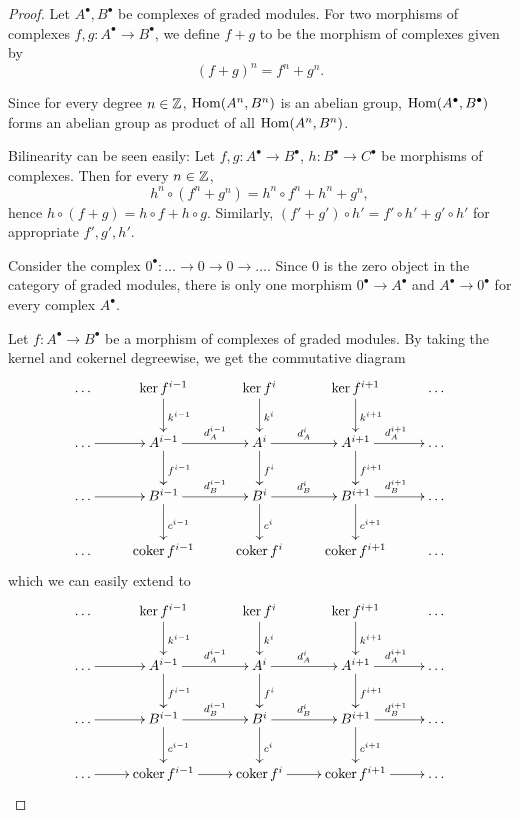 \begin{proof}
    Let $A^\bullet, B^\bullet$ be complexes of graded modules.
    For two morphisms of complexes $f,g: A^\bullet \rightarrow B^\bullet$, we define $f+g$ to be the morphism of complexes given by
    \[
        (f+g)^n = f^n + g^n.
    \]

    Since for every degree $n\in{\mathbb Z}$, $\operatorname{Hom}(A^n, B^n)$ is an abelian group, $\operatorname{Hom}(A^\bullet,B^\bullet)$ forms an abelian group as product of all $\operatorname{Hom}(A^n,B^n)$.

    Bilinearity can be seen easily:
    Let $f,g: A^\bullet \rightarrow B^\bullet$, $h: B^\bullet \rightarrow C^\bullet$ be morphisms of complexes.
    Then for every $n\in{\mathbb Z}$,
    \[
        h^n \circ (f^n + g^n) = h^n \circ f^n + h^n + g^n,
    \]
    hence $h \circ (f + g) = h \circ f + h \circ g$.
    Similarly, $(f'+g') \circ h' = f' \circ h' + g' \circ h'$ for appropriate $f', g', h'$.

    Consider the complex $0^\bullet: \dots \rightarrow 0 \rightarrow 0 \rightarrow \dots$.
    Since $0$ is the zero object in the category of graded modules, there is only one morphism $0^\bullet \rightarrow A^\bullet$ and $A^\bullet \rightarrow 0^\bullet$ for every complex $A^\bullet$.

    Let $f: A^\bullet \rightarrow B^\bullet$ be a morphism of complexes of graded modules.
    By taking the kernel and cokernel degreewise, we get the commutative diagram
    \[
        \xymatrix{
            \dots & \ker f^{i-1} \ar[d]^{k^{i-1}} & \ker f^i \ar[d]^{k^i} & \ker f^{i+1} \ar[d]^{k^{i+1}} & \dots \\
            \dots \ar[r] & A^{i-1} \ar[r]^-{d^{i-1}_A} \ar[d]^{f^{i-1}} & A^i \ar[r]^-{d^i_A} \ar[d]^{f^i} & A^{i+1} \ar[r]^{d^{i+1}_A} \ar[d]^{f^{i+1}} & \dots \\
            \dots \ar[r] & B^{i-1} \ar[r]^-{d^{i-1}_B} \ar[d]^{c^{i-1}} & B^i \ar[r]^-{d^i_B} \ar[d]^{c^i} & B^{i+1} \ar[r]^{d^{i+1}_B} \ar[d]^{c^{i+1}} & \dots \\
            \dots & \coker f^{i-1} & \coker f^i & \coker f^{i+1} & \dots
        }
    \]
    which we can easily extend to
    \[
        \xymatrix{
            \dots & \ker f^{i-1} \ar[d]^{k^{i-1}} & \ker f^i \ar[d]^{k^i} & \ker f^{i+1} \ar[d]^{k^{i+1}} & \dots \\
            \dots \ar[r] & A^{i-1} \ar[r]^-{d^{i-1}_A} \ar[d]^{f^{i-1}} & A^i \ar[r]^-{d^i_A} \ar[d]^{f^i} & A^{i+1} \ar[r]^{d^{i+1}_A} \ar[d]^{f^{i+1}} & \dots \\
            \dots \ar[r] & B^{i-1} \ar[r]^-{d^{i-1}_B} \ar[d]^{c^{i-1}} & B^i \ar[r]^-{d^i_B} \ar[d]^{c^i} & B^{i+1} \ar[r]^{d^{i+1}_B} \ar[d]^{c^{i+1}} & \dots \\
            \dots \ar[r] & \coker f^{i-1} \ar[r] & \coker f^i \ar[r] & \coker f^{i+1} \ar[r] & \dots
        }
    \]


\end{proof}
